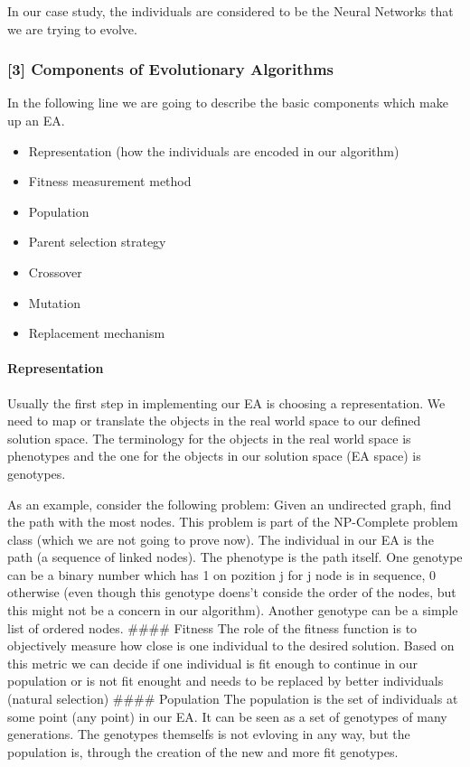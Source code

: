 \documentclass[11pt]{article}
\providecommand{\tightlist}{%
      \setlength{\itemsep}{0pt}\setlength{\parskip}{0pt}}
\begin{document}
In our case study, the individuals are considered to be the Neural
Networks that we are trying to evolve.

    \hypertarget{components-of-evolutionary-algorithms}{%
\subsubsection{{[}3{]} Components of Evolutionary
Algorithms}\label{components-of-evolutionary-algorithms}}

In the following line we are going to describe the basic components
which make up an EA.

\begin{itemize}
\tightlist
\item
  Representation (how the individuals are encoded in our algorithm)
\item
  Fitness measurement method
\item
  Population
\item
  Parent selection strategy
\item
  Crossover
\item
  Mutation
\item
  Replacement mechanism
\end{itemize}

\hypertarget{representation}{%
\paragraph{Representation}\label{representation}}

Usually the first step in implementing our EA is choosing a
representation. We need to map or translate the objects in the real
world space to our defined solution space. The terminology for the
objects in the real world space is phenotypes and the one for the
objects in our solution space (EA space) is genotypes.

As an example, consider the following problem: Given an undirected
graph, find the path with the most nodes. This problem is part of the
NP-Complete problem class (which we are not going to prove now). The
individual in our EA is the path (a sequence of linked nodes). The
phenotype is the path itself. One genotype can be a binary number which
has 1 on pozition j for j node is in sequence, 0 otherwise (even though
this genotype doens't conside the order of the nodes, but this might not
be a concern in our algorithm). Another genotype can be a simple list of
ordered nodes. \#\#\#\# Fitness The role of the fitness function is to
objectively measure how close is one individual to the desired solution.
Based on this metric we can decide if one individual is fit enough to
continue in our population or is not fit enought and needs to be
replaced by better individuals (natural selection) \#\#\#\# Population
The population is the set of individuals at some point (any point) in
our EA. It can be seen as a set of genotypes of many generations. The
genotypes themselfs is not evloving in any way, but the population is,
through the creation of the new and more fit genotypes.
\end{document}
